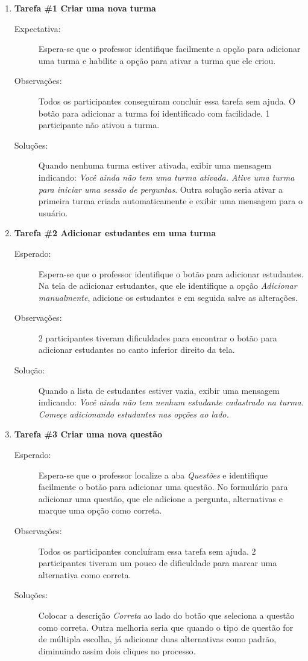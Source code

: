 \begin{enumerate}[label={},leftmargin=*]
  \item \textbf{Tarefa \#1 Criar uma nova turma}
  \begin{description}
    \item [Expectativa:] Espera-se que o professor identifique facilmente a opção para adicionar uma turma e habilite
    a opção para ativar a turma que ele criou.
    \item [Observações:] Todos os participantes conseguiram concluir essa tarefa sem ajuda. O botão
    para adicionar a turma foi identificado com facilidade. 1 participante não ativou a turma.
    \item [Soluções:] Quando nenhuma turma estiver ativada, exibir uma mensagem indicando:
    \textit{Você ainda não tem uma turma ativada. Ative uma turma para iniciar uma sessão de perguntas}.
    Outra solução seria ativar a primeira turma criada automaticamente e exibir uma mensagem para o usuário.
  \end{description}

  \item \textbf{Tarefa \#2 Adicionar estudantes em uma turma}
  \begin{description}
    \item [Esperado:] Espera-se que o professor identifique o botão para adicionar estudantes. Na tela de adicionar
    estudantes, que ele identifique a opção \textit{Adicionar manualmente}, adicione os estudantes e em seguida
    salve as alterações.
    \item [Observações:] 2 participantes tiveram dificuldades para encontrar o botão para
    adicionar estudantes no canto inferior direito da tela.
    \item [Solução:] Quando a lista de estudantes estiver vazia, exibir uma mensagem indicando:
    \textit{Você ainda não tem nenhum estudante cadastrado na turma. Começe adicionando estudantes nas opções ao lado.}
  \end{description}

  \item \textbf{Tarefa \#3 Criar uma nova questão}
  \begin{description}
    \item [Esperado:] Espera-se que o professor localize a aba \textit{Questões} e identifique facilmente
    o botão para adicionar uma questão. No formulário para adicionar uma questão, que ele
    adicione a pergunta, alternativas e marque uma opção como correta.
    \item[Observações:] Todos os participantes concluíram essa tarefa sem ajuda. 2 participantes
    tiveram um pouco de dificuldade para marcar uma alternativa como correta.
    \item[Soluções:]
    Colocar a descrição \textit{Correta} ao lado do botão que seleciona a questão como correta.
    Outra melhoria seria que quando o tipo de questão for de múltipla escolha, já adicionar
    duas alternativas como padrão, diminuindo assim dois cliques no processo.
  \end{description}


\end{enumerate}

